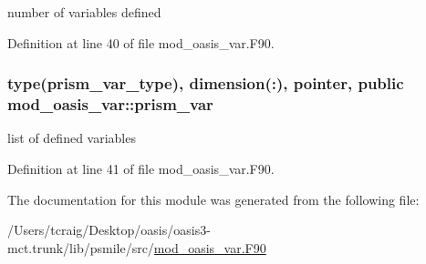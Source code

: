 number of variables defined 



Definition at line 40 of file mod\+\_\+oasis\+\_\+var.\+F90.

\hypertarget{classmod__oasis__var_ae66c490437c2960d795fbd3d2c773a0a}{
\subsubsection[{prism\+\_\+var}]{\setlength{\rightskip}{0pt plus 5cm}type({\bf prism\+\_\+var\+\_\+type}), dimension(\+:), pointer, public mod\+\_\+oasis\+\_\+var\+::prism\+\_\+var}}\label{classmod__oasis__var_ae66c490437c2960d795fbd3d2c773a0a}


list of defined variables 



Definition at line 41 of file mod\+\_\+oasis\+\_\+var.\+F90.



The documentation for this module was generated from the following file\+:\begin{DoxyCompactItemize}
\item 
/\+Users/tcraig/\+Desktop/oasis/oasis3-\/mct.\+trunk/lib/psmile/src/\hyperlink{mod__oasis__var_8_f90}{mod\+\_\+oasis\+\_\+var.\+F90}\end{DoxyCompactItemize}
